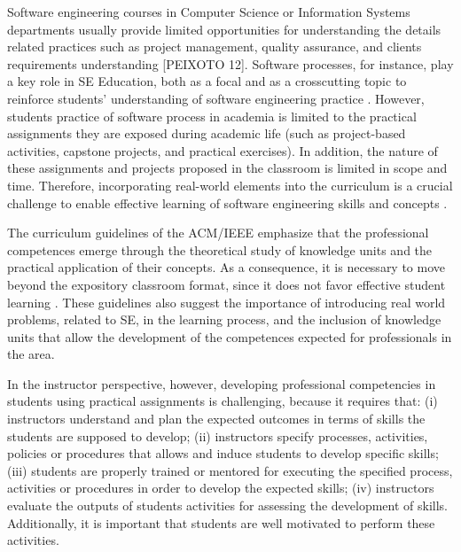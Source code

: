 Software engineering courses in Computer Science or Information Systems departments usually provide limited opportunities for understanding the details related practices such as project management, quality assurance, and clients requirements understanding [PEIXOTO 12]. Software processes, for instance, play a key role in SE Education, both as a focal and as a crosscutting topic to reinforce students’ understanding of software engineering practice \citep{Acm:2015}. However, students practice of software process in academia is limited to the practical assignments they are exposed during academic life (such as project-based activities, capstone projects, and practical exercises). In addition, the nature of these assignments and projects proposed in the classroom is limited in scope and time.  Therefore, incorporating real-world elements into the curriculum is a crucial challenge to enable effective learning of software engineering skills and concepts \citep{Acm:2015}.

The curriculum guidelines of the ACM/IEEE \citep{Acm:2015} emphasize that the professional competences emerge through the theoretical study of knowledge units and the practical application of their concepts. As a consequence, it is necessary to move beyond the expository classroom format, since it does not favor effective student learning \citep{Acm:2015}. These guidelines also suggest the importance of introducing real world problems, related to SE, in the learning process, and the inclusion of knowledge units that allow the development of the competences expected for professionals in the area.

In the instructor perspective, however, developing professional competencies in students using practical assignments is challenging, because it requires that: (i) instructors understand and plan the expected outcomes in terms of skills the students are supposed to develop; (ii) instructors specify processes, activities, policies or procedures that allows and induce students to develop specific skills; (iii) students are properly trained or mentored for executing the specified process, activities or procedures in order to develop the expected skills; (iv) instructors evaluate the outputs of students activities for assessing the development of skills. Additionally, it is important that students are well motivated to perform these activities.

